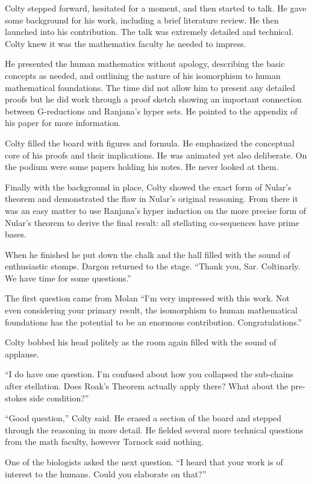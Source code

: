 Colty stepped forward, hesitated for a moment, and then started to talk. He gave some background
for his work, including a brief literature review. He then launched into his contribution. The
talk was extremely detailed and technical. Colty knew it was the mathematics faculty he needed
to impress.

He presented the human mathematics without apology, describing the basic concepts as needed, and
outlining the nature of his isomorphism to human mathematical foundations. The time did not
allow him to present any detailed proofs but he did work through a proof sketch showing an
important connection between G-reductions and Ranjana's hyper sets. He pointed to the appendix
of his paper for more information.

Colty filled the board with figures and formula. He emphasized the conceptual core of his proofs
and their implications. He was animated yet also deliberate. On the podium were some papers
holding his notes. He never looked at them.

Finally with the background in place, Colty showed the exact form of Nular's theorem and
demonstrated the flaw in Nular's original reasoning. From there it was an easy matter to use
Ranjana's hyper induction on the more precise form of Nular's theorem to derive the final
result: all stellating co-sequences have prime bases.

When he finished he put down the chalk and the hall filled with the sound of enthusiastic
stomps. Dargon returned to the stage. ``Thank you, Sar. Coltinarly. We have time for some
questions.''

The first question came from Molan ``I'm very impressed with this work. Not even considering
your primary result, the isomorphism to human mathematical foundations has the potential to be
an enormous contribution. Congratulations.''

Colty bobbed his head politely as the room again filled with the sound of applause.

``I do have one question. I'm confused about how you collapsed the sub-chains after stellation.
Does Roak's Theorem actually apply there? What about the pre-stokes side condition?''

``Good question,'' Colty said. He erased a section of the board and stepped through the
reasoning in more detail. He fielded several more technical questions from the math faculty,
however Tarnock said nothing.

One of the biologists asked the next question. ``I heard that your work is of interest to the
humans. Could you elaborate on that?''

